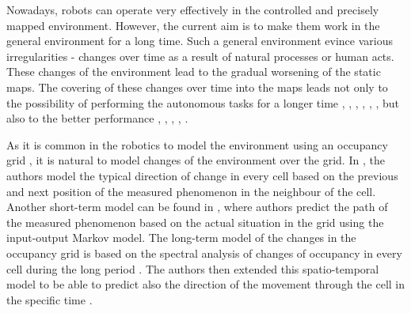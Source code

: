 

Nowadays, robots can operate very effectively in the controlled and precisely mapped environment.
However, the current aim is to make them work in the general environment for a long time.
Such a general environment evince various irregularities - changes over time as a result of natural processes or human acts.
These changes of the environment lead to the gradual worsening of the static maps.
The covering of these changes over time into the maps leads not only to the possibility of performing the autonomous tasks for a longer time \cite{biber2009experimental}, \cite{tipaldi2013lifelong}, \cite{kucner2013conditional}, \cite{krajnik2017fremen}, \cite{churchill2013experience}, \cite{konolige2009towards}, \cite{hochdorfer2009towards}
 but also to the better performance \cite{hawes2017strands}, \cite{santos2016lifelong}, \cite{kunze2018artificial}, \cite{santos2017spatio}, \cite{hanheide2017and}.

As it is common in the robotics to model the environment using an occupancy grid \cite{elfes1989using}, it is natural to model changes of the environment over the grid.
In \cite{kucner2013conditional}, the authors model the typical direction of change in every cell based on the previous and next position of the measured phenomenon in the neighbour of the cell. 
Another short-term model can be found in \cite{wang2014modeling}, where authors predict the path of the measured phenomenon based on the actual situation in the grid using the input-output Markov model.
The long-term model of the changes in the occupancy grid is based on the spectral analysis of changes of occupancy in every cell during the long period \cite{krajnik2017fremen}.
The authors then extended this spatio-temporal model to be able to predict also the direction of the movement through the cell in the specific time \cite{molina2018modelling}.

